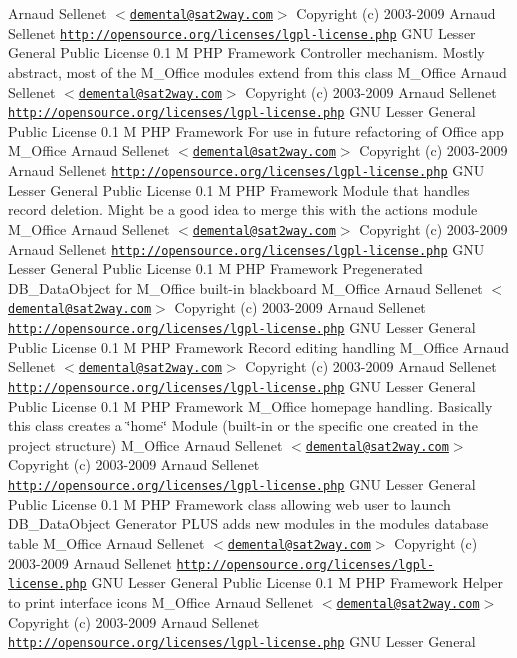 \begin{Desc}
Arnaud Sellenet $<$\href{mailto:demental@sat2way.com}{\tt demental@sat2way.com}$>$  Copyright (c) 2003-2009 Arnaud Sellenet  \href{http://opensource.org/licenses/lgpl-license.php}{\tt http://opensource.org/licenses/lgpl-license.php} GNU Lesser General Public License  0.1  M PHP Framework  Controller mechanism. Mostly abstract, most of the M\_\-Office modules extend from this class   M\_\-Office  Arnaud Sellenet $<$\href{mailto:demental@sat2way.com}{\tt demental@sat2way.com}$>$  Copyright (c) 2003-2009 Arnaud Sellenet  \href{http://opensource.org/licenses/lgpl-license.php}{\tt http://opensource.org/licenses/lgpl-license.php} GNU Lesser General Public License  0.1  M PHP Framework  For use in future refactoring of Office app   M\_\-Office  Arnaud Sellenet $<$\href{mailto:demental@sat2way.com}{\tt demental@sat2way.com}$>$  Copyright (c) 2003-2009 Arnaud Sellenet  \href{http://opensource.org/licenses/lgpl-license.php}{\tt http://opensource.org/licenses/lgpl-license.php} GNU Lesser General Public License  0.1  M PHP Framework  Module that handles record deletion. Might be a good idea to merge this with the actions module   M\_\-Office  Arnaud Sellenet $<$\href{mailto:demental@sat2way.com}{\tt demental@sat2way.com}$>$  Copyright (c) 2003-2009 Arnaud Sellenet  \href{http://opensource.org/licenses/lgpl-license.php}{\tt http://opensource.org/licenses/lgpl-license.php} GNU Lesser General Public License  0.1  M PHP Framework  Pregenerated DB\_\-DataObject for M\_\-Office built-in blackboard   M\_\-Office  Arnaud Sellenet $<$\href{mailto:demental@sat2way.com}{\tt demental@sat2way.com}$>$  Copyright (c) 2003-2009 Arnaud Sellenet  \href{http://opensource.org/licenses/lgpl-license.php}{\tt http://opensource.org/licenses/lgpl-license.php} GNU Lesser General Public License  0.1  M PHP Framework  Record editing handling   M\_\-Office  Arnaud Sellenet $<$\href{mailto:demental@sat2way.com}{\tt demental@sat2way.com}$>$  Copyright (c) 2003-2009 Arnaud Sellenet  \href{http://opensource.org/licenses/lgpl-license.php}{\tt http://opensource.org/licenses/lgpl-license.php} GNU Lesser General Public License  0.1  M PHP Framework  M\_\-Office homepage handling. Basically this class creates a \char`\"{}home\char`\"{} Module (built-in or the specific one created in the project structure)   M\_\-Office  Arnaud Sellenet $<$\href{mailto:demental@sat2way.com}{\tt demental@sat2way.com}$>$  Copyright (c) 2003-2009 Arnaud Sellenet  \href{http://opensource.org/licenses/lgpl-license.php}{\tt http://opensource.org/licenses/lgpl-license.php} GNU Lesser General Public License  0.1  M PHP Framework  class allowing web user to launch DB\_\-DataObject Generator PLUS adds new modules in the modules database table   M\_\-Office  Arnaud Sellenet $<$\href{mailto:demental@sat2way.com}{\tt demental@sat2way.com}$>$  Copyright (c) 2003-2009 Arnaud Sellenet  \href{http://opensource.org/licenses/lgpl-license.php}{\tt http://opensource.org/licenses/lgpl-license.php} GNU Lesser General Public License  0.1  M PHP Framework  Helper to print interface icons   M\_\-Office  Arnaud Sellenet $<$\href{mailto:demental@sat2way.com}{\tt demental@sat2way.com}$>$  Copyright (c) 2003-2009 Arnaud Sellenet  \href{http://opensource.org/licenses/lgpl-license.php}{\tt http://opensource.org/licenses/lgpl-license.php} GNU Lesser General 
\end{Desc}
